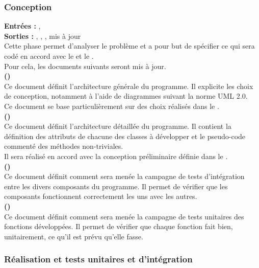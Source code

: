 \subsubsection{Conception}

\textbf{Entrées :} \DSECourt, \DSICourt \\
\textbf{Sorties :} \DCPCourt , \DCDCourt , \PTICourt , \PTUCourt mis à jour\\
Cette phase permet d’analyser le problème et a pour but de spécifier ce qui sera codé en accord avec le \DSECourt{} et le \DSICourt. \\
Pour cela, les documents suivants seront mis à jour. \\

\textbf{\DCP (\DCPCourt)} \\
Ce document définit l’architecture générale du programme. Il explicite les choix de conception, notamment à l’aide de diagrammes suivant la norme UML 2.0.\\ 
Ce document se base particulièrement sur des choix réalisés dans le \DSICourt. \\

\textbf{\DCD (\DCDCourt)} \\
Ce document définit l’architecture détaillée du programme. Il contient la définition des attributs de chacune des classes à développer et le pseudo-code commenté des méthodes non-triviales.\\
Il sera réalisé en accord avec la conception préliminaire définie dans le \DCPCourt.\\

\textbf{\PTI (\PTICourt)} \\
Ce document définit comment sera menée la campagne de tests d’intégration entre les divers composants du programme. Il permet de vérifier que les composants fonctionnent correctement les uns avec les autres.\\

\textbf{\PTU (\PTUCourt)} \\
Ce document définit comment sera menée la campagne de tests unitaires des fonctions développées. Il permet de vérifier que chaque fonction fait bien, unitairement, ce qu’il est prévu qu’elle fasse. \\


\subsubsection{Réalisation et tests unitaires et d’intégration}

